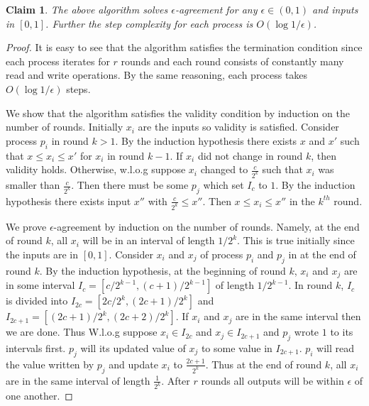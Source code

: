 \documentclass[11pt]{article}
\newtheorem{claim}[theorem]{Claim}
\begin{document}
\begin{claim}
The above algorithm solves $\epsilon$-agreement for any $\epsilon \in (0,1)$ and inputs in $[0,1]$. Further the step complexity for each process is $O(\log 1/\epsilon)$.
\end{claim}
\begin{proof}
It is easy to see that the algorithm satisfies the termination condition since each process iterates for $r$ rounds and each round consists of constantly many read and write operations. By the same reasoning, each process takes $O(\log 1/\epsilon)$ steps. 

We show that the algorithm satisfies the validity condition by induction on the number of rounds. Initially $x_i$ are the inputs so validity is satisfied. Consider process $p_i$ in round $k > 1$. By the induction hypothesis there exists $x$ and $x'$ such that $x \leq x_i \leq x'$ for $x_i$ in round $k-1$. If $x_i$ did not change in round $k$, then validity holds. Otherwise, w.l.o.g suppose $x_i$ changed to $\frac{c}{2^k}$ such that $x_i$ was smaller than $\frac{c}{2^k}$. Then there must be some $p_j$ which set $I_c$ to $1$. By the induction hypothesis there exists input $x''$ with $\frac{c}{2^k} \leq x''$. Then $x \leq x_i \leq x''$ in the $k^{th}$ round. 

We prove $\epsilon$-agreement by induction on the number of rounds. Namely, at the end of round $k$, all $x_i$ will be in an interval of length $1/2^k$. This is true initially since the inputs are in $[0,1]$. Consider $x_i$ and $x_j$ of process $p_i$ and $p_j$ in at the end of round $k$. By the induction hypothesis, at the beginning of round $k$, $x_i$ and $x_j$ are in some interval $I_{c} = [c/2^{k-1}, (c+1)/2^{k-1}]$ of length $1/2^{k-1}$. In round $k$, $I_c$ is divided into $I_{2c} = [2c/2^k, (2c+1)/2^k]$ and $I_{2c+1} = [(2c+1)/2^k, (2c+2)/2^k]$. If $x_i$ and $x_j$ are in the same interval then we are done. Thus  W.l.o.g suppose $x_i \in I_{2c}$ and $x_j \in I_{2c+1}$ and $p_j$ wrote $1$ to its intervals first. $p_j$ will its updated value of $x_j$ to some value in $I_{2c+1}$. $p_i$ will read the value written by $p_j$ and update $x_i$ to $\frac{2c+1}{2^k}$. Thus at the end of round $k$, all $x_i$ are in the same interval of length $\frac{1}{2^k}$. After $r$ rounds all outputs will be within $\epsilon$ of one another.
\end{proof}
\end{document}
